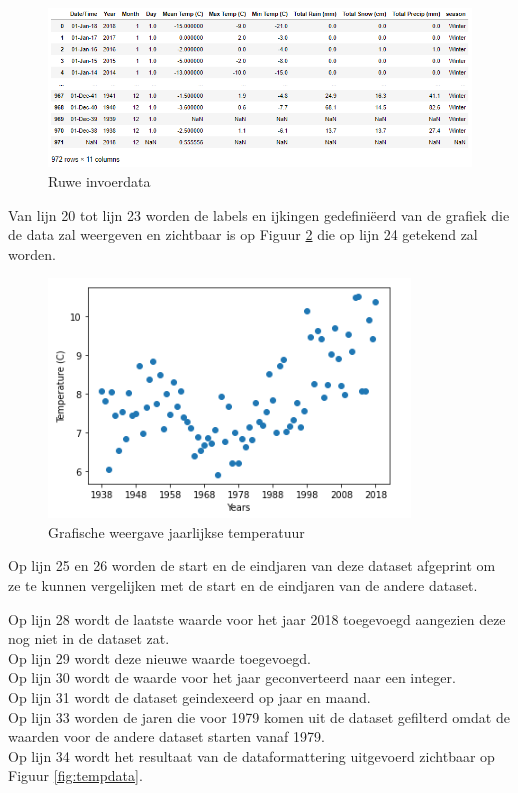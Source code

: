 \begin{figure}[!h]
    \centering
    \caption{Ruwe invoerdata}
    \label{fig:tempdataraw.png}
    \includegraphics[width=1\linewidth]{temp_data_rawpng}
\end{figure}


Van lijn 20 tot lijn 23 worden de labels en ijkingen gedefini\"{e}erd van de grafiek die de data zal weergeven en zichtbaar is op Figuur \ref{fig:tempdatagraph} die op lijn 24 getekend zal worden. \\



\begin{figure}[!h]
    \caption{Grafische weergave jaarlijkse temperatuur}
    \label{fig:tempdatagraph}
    \centering
    \includegraphics[width=0.7\linewidth]{temp_data_graph}
\end{figure}

Op lijn 25 en 26 worden de start en de eindjaren van deze dataset afgeprint om ze te kunnen vergelijken met de start en de eindjaren van de andere dataset.

Op lijn 28 wordt de laatste waarde voor het jaar 2018 toegevoegd aangezien deze nog niet in de dataset zat. \\
Op lijn 29 wordt deze nieuwe waarde toegevoegd.\\

Op lijn 30 wordt de waarde voor het jaar geconverteerd naar een integer. \\
Op lijn 31 wordt de dataset geindexeerd op jaar en maand. \\
Op lijn 33 worden de jaren die voor 1979 komen uit de dataset gefilterd omdat de waarden voor de andere dataset starten vanaf 1979.\\
Op lijn 34 wordt het resultaat van de dataformattering uitgevoerd zichtbaar op Figuur \ref{fig:tempdata}.




